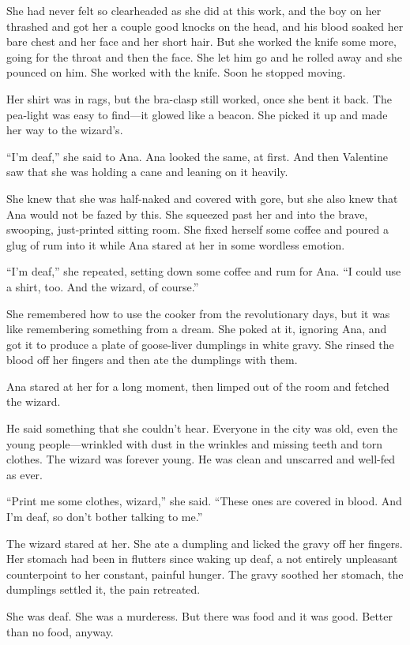 She had never felt so clearheaded as she did at this work, and the
boy on her thrashed and got her a couple good knocks on the head,
and his blood soaked her bare chest and her face and her short
hair. But she worked the knife some more, going for the throat and
then the face. She let him go and he rolled away and she pounced on
him. She worked with the knife. Soon he stopped moving.

Her shirt was in rags, but the bra-clasp still worked, once she
bent it back. The pea-light was easy to find—it glowed like a
beacon. She picked it up and made her way to the wizard’s.

“I’m deaf,” she said to Ana. Ana looked the same, at first. And
then Valentine saw that she was holding a cane and leaning on it
heavily.

She knew that she was half-naked and covered with gore, but she
also knew that Ana would not be fazed by this. She squeezed past
her and into the brave, swooping, just-printed sitting room. She
fixed herself some coffee and poured a glug of rum into it while
Ana stared at her in some wordless emotion.

“I’m deaf,” she repeated, setting down some coffee and rum for Ana.
“I could use a shirt, too. And the wizard, of course.”

She remembered how to use the cooker from the revolutionary days,
but it was like remembering something from a dream. She poked at
it, ignoring Ana, and got it to produce a plate of goose-liver
dumplings in white gravy. She rinsed the blood off her fingers and
then ate the dumplings with them.

Ana stared at her for a long moment, then limped out of the room
and fetched the wizard.

He said something that she couldn’t hear. Everyone in the city was
old, even the young people—wrinkled with dust in the wrinkles and
missing teeth and torn clothes. The wizard was forever young. He
was clean and unscarred and well-fed as ever.

“Print me some clothes, wizard,” she said. “These ones are covered
in blood. And I’m deaf, so don’t bother talking to me.”

The wizard stared at her. She ate a dumpling and licked the gravy
off her fingers. Her stomach had been in flutters since waking up
deaf, a not entirely unpleasant counterpoint to her constant,
painful hunger. The gravy soothed her stomach, the dumplings
settled it, the pain retreated.

She was deaf. She was a murderess. But there was food and it was
good. Better than no food, anyway.


